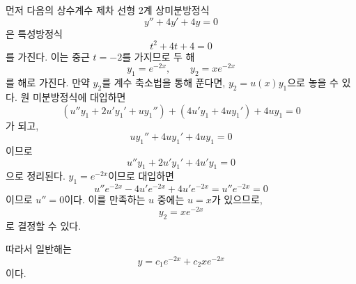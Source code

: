 \documentclass[../engineering_mathematics_lecture_note.tex]{subfiles}
\begin{document}
\begin{example}
    먼저 다음의 상수계수 제차 선형 2계 상미분방정식
    \begin{equation*}
        y'' + 4y' + 4y = 0
    \end{equation*}
    은 특성방정식
    \begin{equation*}
        t^2 + 4t + 4 = 0
    \end{equation*}
    를 가진다.
    이는 중근 $t = -2$를 가지므로 두 해
    \begin{equation*}
        y_1 = e^{-2x},\qquad y_2 = xe^{-2x}
    \end{equation*}
    를 해로 가진다.
    만약 $y_2$를 계수 축소법을 통해 푼다면, $y_2 = u(x) y_1$으로 놓을 수 있다.
    원 미분방정식에 대입하면
    \begin{equation*}
        \left( u'' y_1 + 2 u' y_1' + u y_1'' \right) + \left( 4u' y_1 + 4uy_1' \right) + 4uy_1 = 0
    \end{equation*}
    가 되고,
    \begin{equation*}
        uy_1'' + 4u y_1' + 4u y_1 = 0
    \end{equation*}
    이므로
    \begin{equation*}
        u'' y_1 + 2u' y_1' + 4u' y_1 = 0
    \end{equation*}
    으로 정리된다.
    $y_1 = e^{-2x}$이므로 대입하면
    \begin{equation*}
        u'' e^{-2x} - 4 u' e^{-2x} + 4u' e^{-2x} = u'' e^{-2x} = 0
    \end{equation*}
    이므로 $u'' = 0$이다.
    이를 만족하는 $u$ 중에는 $u = x$가 있으므로,
    \begin{equation*}
        y_2 = x e^{-2x}
    \end{equation*}
    로 결정할 수 있다.

    따라서 일반해는
    \begin{equation*}
        y = c_1 e^{-2x} + c_2 xe^{-2x}
    \end{equation*}
    이다.
\end{example}
\end{document}
